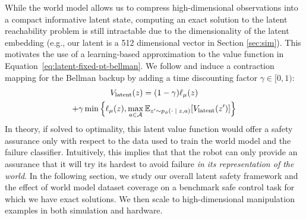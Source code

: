 

While the world model allows us to compress high-dimensional observations into a compact informative latent state, computing an exact solution to the latent reachability problem is still intractable due to the dimensionality of the latent embedding (e.g., our latent is a 512 dimensional vector in Section \ref{sec:sim}). This motivates the use of a learning-based approximation to the value function in Equation~\ref{eq:latent-fixed-pt-bellman}. We follow \cite{fisac2019bridging} and induce a contraction mapping for the Bellman backup by adding a time discounting factor $\gamma \in [0,1)$:
\begin{multline}
        \label{eqn:discounted-safety-bellman}
        V_{\textrm{latent}}(z) = (1-\gamma)\ell_\mu(z) \\ + \gamma \min \Big\{ \ell_\mu(z), \max_{a \in \mathcal{A}}     \mathbb{E}_{z' \sim p_\phi(\cdot \; | \;z, a)}[V_{\textrm{latent}}(z')] \Big\}
\end{multline}
In theory, if solved to optimality, this latent value function would offer a safety assurance only with respect to 
the data used to train the world model and the failure classifier. 
Intuitively, this implies that that the robot can only provide an assurance that it will try its hardest to avoid failure \textit{in its representation of the world}. 
In the following section, we study our overall latent safety framework and the effect of world model dataset coverage on a benchmark safe control task for which we have exact solutions. 
We then scale to high-dimensional manipulation examples in both simulation and hardware. 


